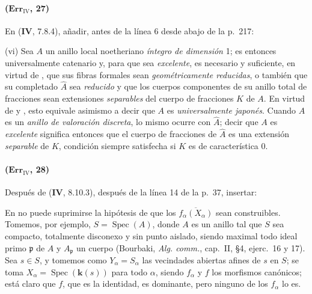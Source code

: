 \paragraph{($\mathbf{Err}_{\mathrm{IV}}$, 27)}
En (\textbf{IV}, 7.8.4), añadir, antes de la línea 6 desde abajo de la p.~217:

\smallskip
\noindent
\textup{(vi)} Sea $A$ un anillo local noetheriano \emph{íntegro de dimensión}
1; es entonces universalmente catenario
{} y, para que sea \emph{excelente},
es necesario y suficiente, en virtud de
{}, que sus fibras
formales sean \emph{geométricamente reducidas}, o también que su completado
$\widehat A$ sea \emph{reducido} y que los cuerpos componentes de su anillo total
de fracciones sean extensiones \emph{separables} del cuerpo de fracciones
$K$ de $A$. En virtud de {} y
{}, esto equivale asimismo a
decir que $A$ es \emph{universalmente japonés}. Cuando $A$ es un \emph{anillo de
valoración discreta}, lo mismo ocurre con $\widehat A$; decir que $A$ es
\emph{excelente} significa entonces que el cuerpo de fracciones de $\widehat A$
es una extensión \emph{separable} de $K$, condición siempre satisfecha si
$K$ es de característica 0.

\paragraph{($\mathbf{Err}_{\mathrm{IV}}$, 28)}
Después de (\textbf{IV}, 8.10.3), después de la línea 14 de la p.~37, insertar:

\begin{remark}[8.10.3.1]
\label{IV.8.10.3.1}
En {} no puede suprimirse
la hipótesis de que los $\overline{f_\alpha(X_\alpha)}$ sean
construibles. Tomemos, por ejemplo, $S=\operatorname{Spec}(A)$, donde $A$
es un anillo tal que $S$ sea compacto, totalmente disconexo y sin
punto aislado, siendo maximal todo ideal primo $\mathfrak p$ de $A$ y
$A_\mathfrak p$ un cuerpo (Bourbaki, \emph{Alg. comm.}, cap.~II,
\S4, ejerc.~16 y 17). Sea $s\in S$, y tomemos como
$Y_\alpha=S_\alpha$ las vecindades abiertas afines de $s$ en $S$; se
toma $X_\alpha=\operatorname{Spec}(\boldsymbol{k}(s))$ para todo $\alpha$,
siendo $f_\alpha$ y $f$ los morfismos canónicos; está claro que
$f$, que es la identidad, es dominante, pero ninguno de los $f_\alpha$ lo
es.
\end{remark}

